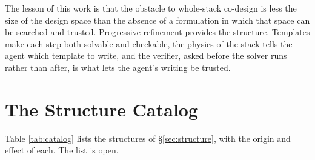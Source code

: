 \documentclass[11pt]{article}
\begin{document}
The lesson of this work is that the obstacle to whole-stack co-design is less the size of the design space than the absence of a formulation in which that space can be searched and trusted. Progressive refinement provides the structure. Templates make each step both solvable and checkable, the physics of the stack tells the agent which template to write, and the verifier, asked before the solver runs rather than after, is what lets the agent's writing be trusted.

\appendix

\section{The Structure Catalog}\label{app:catalog}

Table \ref{tab:catalog} lists the structures of §\ref{sec:structure}, with the origin and effect of each. The list is open.
\end{document}
